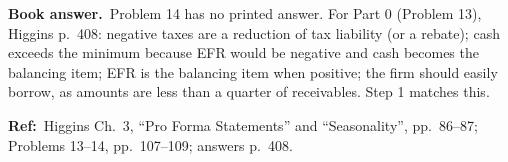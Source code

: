 \documentclass[11pt,a4paper]{article}
\newcommand{\bookans}{\par\medskip\noindent\textbf{Book answer.}~}
\newcommand{\refbib}{\par\smallskip\noindent\textbf{Ref:}~}
\begin{document}
\bookans Problem 14 has no printed answer. For Part 0 (Problem 13), Higgins p.~408: negative taxes
are a reduction of tax liability (or a rebate); cash exceeds the minimum because EFR would be
negative and cash becomes the balancing item; EFR is the balancing item when positive; the firm
should easily borrow, as amounts are less than a quarter of receivables. Step 1 matches this.

\refbib Higgins Ch.~3, ``Pro Forma Statements'' and ``Seasonality'', pp.~86--87; Problems 13--14,
pp.~107--109; answers p.~408.
\end{document}
